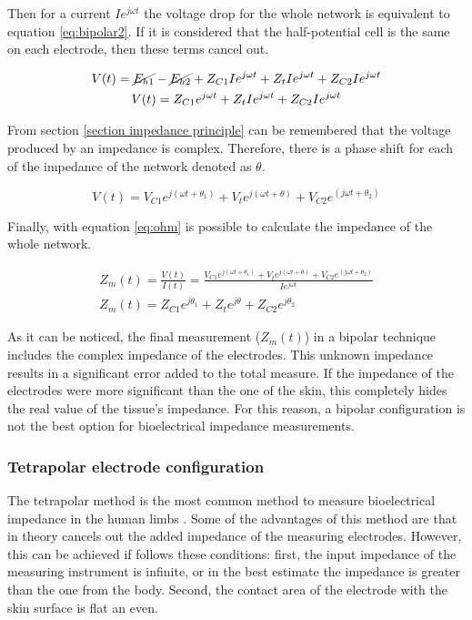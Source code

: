 Then for a current $Ie^{j \omega t}$ the voltage drop for the whole network is equivalent to equation \ref{eq:bipolar2}. If it is considered that the half-potential cell is the same on each electrode, then these terms cancel out. 

\begin{gather}
	\label{eq:bipolar2}
	V(t) = \cancel{E_{h1}} - \cancel{E_{h2}} + Z_{C1}I e^{j \omega t} +Z_t I e^{j \omega t} +Z_{C2}I e^{j \omega t}
	\\
	\label{eq:bipolar3}
	V(t) = Z_{C1}e^{j \omega t} +Z_t I e^{j \omega t} +Z_{C2}I e^{j \omega t}
\end{gather}

From section \ref{section impedance principle} can be remembered that the voltage produced by an impedance is complex. Therefore, there is a phase shift for each of the impedance of the network denoted as $\theta$.

\begin{equation}
	\label{eq:bipolar4}
	V(t) = V_{C1} e^{j(\omega t + \theta_1)} + V_t e^{j( \omega t + \theta)} +V_{C2} e^{(j \omega t + \theta_2)}
\end{equation} 

Finally, with equation \ref{eq:ohm} is possible to calculate the impedance of the whole network.

\begin{gather}
	\label{eq:bipolar5}
	Z_m(t) =\frac{V(t)}{I(t)} = \frac{V_{C1} e^{j( \omega t + \theta_1)} + V_t e^{j( \omega t + \theta)} +V_{C2} e^{(j \omega t + \theta_2)}}{I e^{j \omega t}} \\
	Z_m(t) = Z_{C1}e^{j\theta_1} + Z_{t}e^{j\theta} + Z_{C2}e^{j\theta_2}
\end{gather} 

As it can be noticed, the final measurement ($Z_m(t)$) in a bipolar technique includes the complex impedance of the electrodes. This unknown impedance results in a significant error added to the total measure. If the impedance of the electrodes were more significant than the one of the skin, this completely hides the real value of the tissue's impedance. For this reason, a bipolar configuration is not the best option for bioelectrical impedance measurements. 

\subsubsection{Tetrapolar electrode configuration}
The tetrapolar method is the most common method to measure bioelectrical impedance in the human limbs \cite{costeloe1980continuous, yamakoshi1980limb, nyboer1974blood, yamamoto1992impedance}. Some of the advantages of this method are that in theory cancels out the added impedance of the measuring electrodes. However, this can be achieved if follows these conditions: first, the input impedance of the measuring instrument is infinite, or in the best estimate the impedance is greater than the one from the body. Second, the contact area of the electrode with the skin surface is flat an even.

